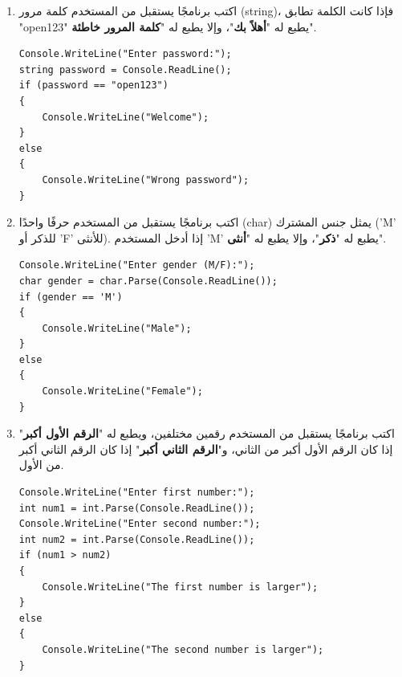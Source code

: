 \documentclass[14pt]{extarticle}
\begin{document}
\begin{enumerate}[itemsep=2em]
\filbreak
\item
اكتب برنامجًا يستقبل من المستخدم كلمة مرور (\textenglish{string})، فإذا كانت الكلمة تطابق \textenglish{"open123"} يطبع له "\textbf{أهلاً بك}"، وإلا يطبع له "\textbf{كلمة المرور خاطئة}".
\ifwithsols
\begin{boxSolution}
\begin{english}
\begin{verbatim}
Console.WriteLine("Enter password:");
string password = Console.ReadLine();
if (password == "open123")
{
    Console.WriteLine("Welcome");
}
else
{
    Console.WriteLine("Wrong password");
}
\end{verbatim}
\end{english}
\end{boxSolution}
\fi

\filbreak
\item
اكتب برنامجًا يستقبل من المستخدم حرفًا واحدًا (\textenglish{char}) يمثل جنس المشترك (\textenglish{'M'} للذكر أو \textenglish{'F'} للأنثى). إذا أدخل المستخدم \textenglish{'M'} يطبع له "\textbf{ذكر}"، وإلا يطبع له "\textbf{أنثى}".
\ifwithsols
\begin{boxSolution}
\begin{english}
\begin{verbatim}
Console.WriteLine("Enter gender (M/F):");
char gender = char.Parse(Console.ReadLine());
if (gender == 'M')
{
    Console.WriteLine("Male");
}
else
{
    Console.WriteLine("Female");
}
\end{verbatim}
\end{english}
\end{boxSolution}
\fi

\filbreak
\item
اكتب برنامجًا يستقبل من المستخدم رقمين مختلفين، ويطبع له "\textbf{الرقم الأول أكبر}" إذا كان الرقم الأول أكبر من الثاني، و"\textbf{الرقم الثاني أكبر}" إذا كان الرقم الثاني أكبر من الأول.
\ifwithsols
\begin{boxSolution}
\begin{english}
\begin{verbatim}
Console.WriteLine("Enter first number:");
int num1 = int.Parse(Console.ReadLine());
Console.WriteLine("Enter second number:");
int num2 = int.Parse(Console.ReadLine());
if (num1 > num2)
{
    Console.WriteLine("The first number is larger");
}
else
{
    Console.WriteLine("The second number is larger");
}
\end{verbatim}
\end{english}
\end{boxSolution}
\fi


\end{enumerate}
\end{document}
